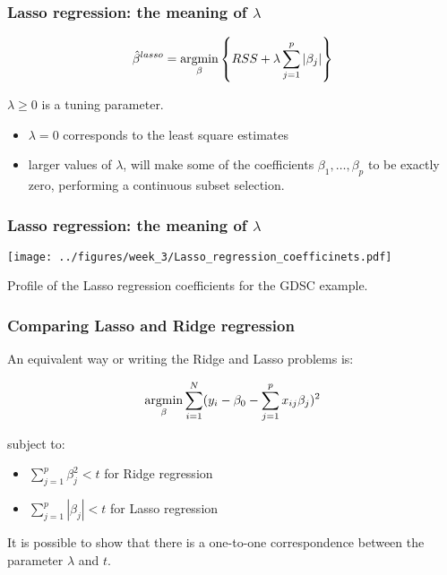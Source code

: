 \documentclass[notes]{beamer}          %
\newcommand{\argmin}{\operatornamewithlimits{argmin}}
\begin{document}
\begin{frame}
\frametitle{Lasso regression: the meaning of $\lambda$}

\begin{equation*}
    \hat{\beta}^{lasso} =  \argmin_{\beta} \left\{ RSS + \lambda \sum_{j=1}^p | \beta_j | \right\}
\end{equation*}

$\lambda \geq 0$ is a tuning parameter.

\begin{itemize}
    \item $\lambda = 0$ corresponds to the least square estimates
    \item larger values of $\lambda$, will make some of the coefficients $\beta_1, \dots, \beta_p$ to be exactly zero, performing a continuous subset selection.
\end{itemize}
\end{frame}

\begin{frame}
\frametitle{Lasso regression: the meaning of $\lambda$}

\begin{center}
\texttt{[image: ../figures/week\_3/Lasso\_regression\_coefficinets.pdf]}
\end{center}

Profile of the Lasso regression coefficients for the GDSC example.

\end{frame}

\begin{frame}
\frametitle{Comparing Lasso and Ridge regression}

An equivalent way or writing the Ridge and Lasso problems is:

\begin{equation*}
    \argmin_{\beta} \sum_{i=1}^N (y_i - \beta_0 -  \sum_{j=1}^p x_{ij}\beta_j)^2
\end{equation*}

subject to: 
\begin{itemize}
    \item $\sum_{j=1}^p \beta_j^2 < t$ for Ridge regression
    \item $\sum_{j=1}^p | \beta_j | < t$ for Lasso regression
\end{itemize}

\vspace{5mm} 

It is possible to show that there is a one-to-one correspondence between the parameter $\lambda$ and $t$.

\end{frame}
\end{document}
